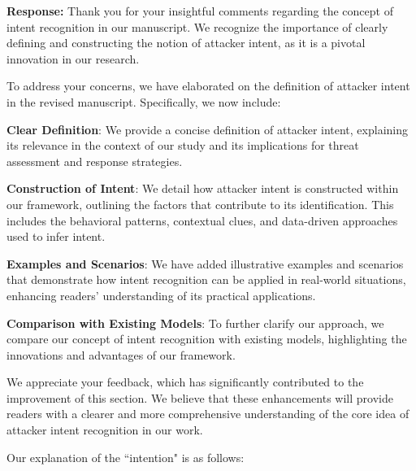 \documentclass[a4paper,twoside,11pt,dvipsnames]{reviewresponse}
\begin{document}



\textbf{Response:}
Thank you for your insightful comments regarding the concept of intent recognition in our manuscript. We recognize the importance of clearly defining and constructing the notion of attacker intent, as it is a pivotal innovation in our research.

To address your concerns, we have elaborated on the definition of attacker intent in the revised manuscript. Specifically, we now include:

\textbf{Clear Definition}: We provide a concise definition of attacker intent, explaining its relevance in the context of our study and its implications for threat assessment and response strategies.

\textbf{Construction of Intent}: We detail how attacker intent is constructed within our framework, outlining the factors that contribute to its identification. This includes the behavioral patterns, contextual clues, and data-driven approaches used to infer intent.

\textbf{Examples and Scenarios}: We have added illustrative examples and scenarios that demonstrate how intent recognition can be applied in real-world situations, enhancing readers’ understanding of its practical applications.

\textbf{Comparison with Existing Models}: To further clarify our approach, we compare our concept of intent recognition with existing models, highlighting the innovations and advantages of our framework.

We appreciate your feedback, which has significantly contributed to the improvement of this section. We believe that these enhancements will provide readers with a clearer and more comprehensive understanding of the core idea of attacker intent recognition in our work.


Our explanation of the ``intention" is as follows:
\end{document}
